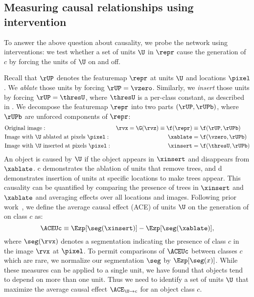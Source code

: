 \documentclass{article} %
\begin{document}
\subsection{Measuring causal relationships using intervention}
To answer the above question about causality, we probe the network using interventions: we test whether a set of units $\U$ in $\repr$ cause the generation of $c$ by forcing the units of $\U$ on and off.

Recall that $\rUP$ denotes the featuremap $\repr$ at units $\U$  and locations $\pixel$.  We \textit{ablate} those units by forcing $\rUP = \vzero$. Similarly, we \textit{insert} those units by forcing $\rUP = \thresU$, where $\thresU$ is a per-class constant, as described in . 
We decompose the featuremap $\repr$ into two parts $(\rUP, \rUPb)$, where $\rUPb$ are unforced components of $\repr$:
\vspace{-5pt}\begin{align}
\label{eq:intervention}
&\text{Original image}: &\rvx = \G(\rvz)  \equiv  \f(\repr) & \equiv  \f(\rUP, \rUPb) \\ \nonumber
&\text{Image with $\U$ ablated at pixels $\pixel$}: & \xablate & =  \f(\vzero, \rUPb) \\ \nonumber
&\text{Image with $\U$ inserted at pixels $\pixel$}: & \xinsert & = \f(\thresU, \rUPb)
\end{align}
An object is caused by $\U$ if the object appears in $\xinsert$ and disappears from $\xablate$.  c demonstrates the ablation of units that remove trees, and  d demonstrates insertion of units at specific locations to make trees appear.  This causality can be quantified by comparing the presence of trees in $\xinsert$ and $\xablate$ and averaging effects over all locations and images.  Following prior work~\citep{holland1988causal,pearl2009causality},
 we define the average causal effect (ACE) of units $\U$ on the generation of on class $c$ as:
\begin{equation}
\ACEUc  \equiv \Ezp[\seg(\xinsert)] - \Ezp[\seg(\xablate)],
\end{equation}
where $\seg(\rvx)$ denotes a segmentation indicating the presence of class $c$ in the image $\rvx$ at $\pixel$. 
To permit comparisons of $\ACEUc$ between classes $c$ which are rare, we normalize our segmentation $\seg$ by $\Ezp[\seg(x)]$.  While these measures can be applied to a single unit, we have found that objects tend to depend on more than one unit. Thus we need to identify a set of units $\U$ that maximize the average causal effect $\ACE_{\U\rightarrow c}$ for an object class $c$.
\end{document}
